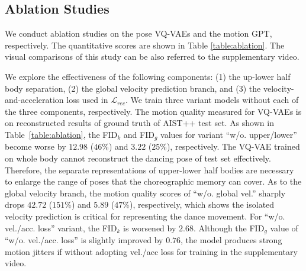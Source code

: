 \vspace{-4pt}
\subsection{Ablation Studies}
\label{sec:ablation}
\vspace{-3pt}

We conduct ablation studies on the pose VQ-VAEs and the motion GPT, respectively.
The quantitative scores are shown in Table \ref{table:ablation}.
The visual comparisons of this study can be also referred to the supplementary video.





We explore the effectiveness of the following components: (1) the up-lower half body separation, (2) the global velocity prediction branch, and (3) the velocity-and-acceleration loss used in $\mathcal L_{rec}$.
We train three variant models without each of the three components, respectively.
The motion quality measured for VQ-VAEs is on reconstructed results of ground truth of AIST++ test set.
As shown in Table~\ref{table:ablation}, the FID$_k$ and FID$_g$ values for variant ``w/o. upper/lower'' become worse by $12.98$ ($46\%$) and $3.22$ ($25\%$), respectively.
The VQ-VAE trained on whole body cannot reconstruct the dancing pose of test set effectively.
Therefore, the separate representations of upper-lower half bodies are necessary to enlarge the range of poses that the choreographic memory can cover.
As to the global velocity branch, the motion quality scores of ``w/o. global vel.'' sharply drops $42.72$ ($151\%$) and $5.89$ ($47\%$), respectively, which shows the isolated velocity prediction is critical for representing the dance movement.
For ``w/o. vel./acc. loss'' variant, the FID$_k$ is worsened by $2.68$.
Although the FID$_g$ value of ``w/o. vel./acc. loss'' is slightly improved by $0.76$, 
the model produces strong motion jitters if without adopting vel./acc loss for training in the supplementary video.



